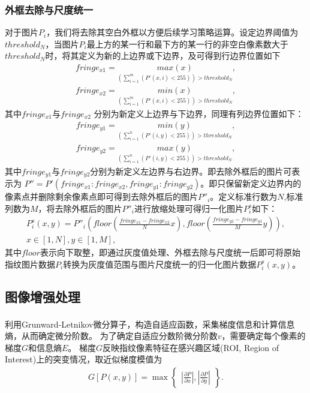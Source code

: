 \documentclass{whutmod}
\newcommand{\upcite}[1]{\textsuperscript{\cite{#1}}}
\begin{document}
\subsubsection{外框去除与尺度统一}
对于图片$P_{i}$，我们将去除其空白外框以方便后续学习策略运算。设定边界阈值为$threshold_N$，当图片$P_{i}$最上方的某一行和最下方的某一行的非空白像素数大于$threshold_N$时，将其定义为新的上边界或下边界，及可得到行边界位置如下
\begin{gather*}
	fringe_{x1}=\underset{ (\sum_{i=1}^{m} (P'(x,i)<255))>threshold_N}{max(x)},\\
	fringe_{x2}=\underset{(\sum_{i=1}^{m} (P'(x,i)<255))>threshold_N}{min(x)},
\end{gather*}
其中$fringe_{x1}$与$fringe_{x2}$ 分别为新定义上边界与下边界，同理有列边界位置如下：
\begin{gather*}
	fringe_{y1}=\underset{(\sum_{i=1}^{n} (P'(i,y)<255))>threshold_N}{min(y)},\\
	fringe_{y2}=\underset{(\sum_{i=1}^{n} (P'(i,y)<255))>threshold_N}{max(y)},
\end{gather*}
其中$fringe_{y1}$与$fringe_{y2}$分别为新定义左边界与右边界。即去除外框后的图片可表示为	$P''=P'(	fringe_{x1}:	fringe_{x2},	fringe_{y1}:	fringe_{y2})$。即只保留新定义边界内的像素点并删除剩余像素点即可得到去除外框后的图片$P''_{i}$。定义标准行数为$N$,标准列数为$M$，将去除外框后的图片$P''_{i}$进行放缩处理可得归一化图片$P_{i}^s$如下：
\begin{gather*}
	P_{i}^s(x,y)=P''_{i}(floor(\frac{fringe_{x1}-fringe_{x2}}{N}x),floor(\frac{fringe_{y2}-fringe_{y1}}{M}y)),\\
	x\in[1,N],	y\in[1,M],
\end{gather*}
其中$floor$表示向下取整，即通过灰度值处理、外框去除与尺度统一后即可将原始指纹图片数据$P_{i}$转换为灰度值范围与图片尺度统一的归一化图片数据$P_{i}^s(x,y)$。
\subsection{图像增强处理}
利用Grunward-Letnikov微分算子\upcite{5}，构造自适应函数，采集梯度信息和计算信息熵，从而确定微分阶数。	
为了确定自适应分数阶微分阶数$v$，需要确定每个像素的梯度$G$和信息熵$E$。
梯度$G$反映指纹像素特征在感兴趣区域(ROI, Region of Interest)上的突变情况，取近似梯度模值为
\begin{gather}
	\displaystyle G[P(x,y)]=\max\begin{Bmatrix}
		|\frac{\partial P }{\partial x}|,|\frac{\partial P}{\partial y}|
	\end{Bmatrix}.
\end{gather}
\end{document}
